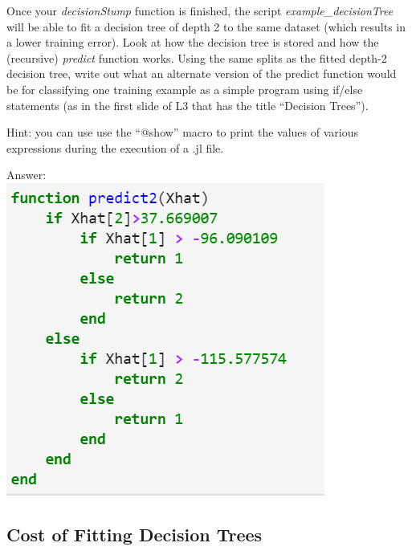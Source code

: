 \documentclass{article}
\def\ans#1{\par\gre{Answer: #1}}
\def\blu#1{{\color{blu}#1}}
\def\gre#1{{\color{gre}#1}}
\begin{document}
Once your \emph{decisionStump} function is finished, the script \emph{example\_decisionTree} will be able to fit a decision tree of depth 2 to the same dataset (which results in a lower training error). Look at how the decision tree is stored and how the (recursive) \emph{predict} function works. \blu{Using the same splits as the fitted depth-2 decision tree, write out what an alternate version of the predict function would be for classifying one training example as a simple program using if/else statements (as in the first slide of L3 that has the title ``Decision Trees'').}

Hint: you can use use the ``@show'' macro to print the values of various expressions during the execution of a .jl file.
\ans{\\
    \includegraphics{DecTreeEquivalent.PNG}
}
\subsection{Cost of Fitting Decision Trees}
\end{document}
